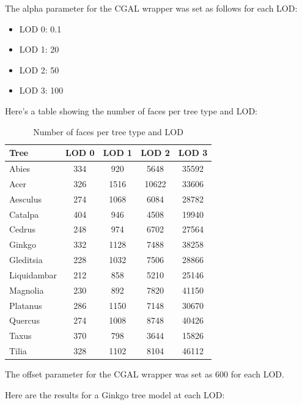 \documentclass[12pt]{article}
\begin{document}
The alpha parameter for the CGAL wrapper was set as follows for each LOD:

\begin{itemize}
    \item LOD 0: 0.1
    \item LOD 1: 20
    \item LOD 2: 50
    \item LOD 3: 100
\end{itemize}

Here's a table showing the number of faces per tree type and LOD:

\begin{table}[h]
    \centering
    \begin{tabular}{|l|c|c|c|c|}
    \hline
    Tree & LOD 0 & LOD 1 & LOD 2 & LOD 3 \\
    \hline
    Abies & 334 & 920 & 5648 & 35592 \\
    Acer & 326 & 1516 & 10622 & 33606 \\
    Aesculus & 274 & 1068 & 6084 & 28782 \\
    Catalpa & 404 & 946 & 4508 & 19940 \\
    Cedrus & 248 & 974 & 6702 & 27564 \\
    Ginkgo & 332 & 1128 & 7488 & 38258 \\
    Gleditsia & 228 & 1032 & 7506 & 28866 \\
    Liquidambar & 212 & 858 & 5210 & 25146 \\
    Magnolia & 230 & 892 & 7820 & 41150 \\
    Platanus & 286 & 1150 & 7148 & 30670 \\
    Quercus & 274 & 1008 & 8748 & 40426 \\
    Taxus & 370 & 798 & 3644 & 15826 \\
    Tilia & 328 & 1102 & 8104 & 46112 \\
    \hline
    \end{tabular}
    \caption{Number of faces per tree type and LOD}
    \label{tab:my_label}
\end{table}

The offset parameter for the CGAL wrapper was set as 600 for each LOD.

Here are the results for a Ginkgo tree model at each LOD:
\end{document}
